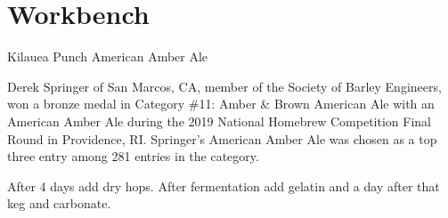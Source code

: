 \documentclass[10pt,oneside]{scrbook}
\begin{document}
\mainmatter
\twocolumn

\part{Workbench}

\begin{recipie}{Kilauea Punch American Amber Ale}

\begin{aboutblock}
Derek Springer of San Marcos, CA, member of the Society of Barley Engineers,
won a bronze medal in Category \#11: Amber \& Brown American Ale with an
American Amber Ale during the 2019 National Homebrew Competition Final Round
in Providence, RI. Springer's American Amber Ale was chosen as a top three
entry among 281 entries in the category.
\end{aboutblock}


\begin{methodandtiming}
 
\begin{mashsteps}
\end{mashsteps}

\begin{fermentationsteps}
\end{fermentationsteps}

\begin{directions}
After 4 days add dry hops. After fermentation add gelatin and a day after that
keg and carbonate.
\end{directions}

\end{methodandtiming}

\pagebreak

\begin{ingredientsblock}

\begin{malts}
\end{malts}


\end{ingredientsblock}
\end{recipie}
\end{document}
